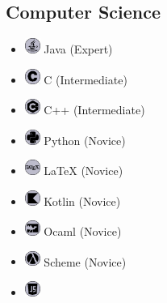 \documentclass[11pt, a4paper, sans]{moderncv}
\begin{document}
\subsection{Computer  Science}
\begin{multicols}{3}
	\begin{itemize}
	\item
		\includegraphics[align=c,width=5mm,height=5mm]{java.jpg}
		Java \footnotesize(Expert)\normalsize
	\item
		\includegraphics[align=c,width=5mm,height=5mm]{c.jpg}
		C \footnotesize(Intermediate)\normalsize
	\item
		\includegraphics[align=c,width=5mm,height=5mm]{cpp.jpg}
		 C++ \footnotesize(Intermediate)\normalsize
	\item
		\includegraphics[align=c,width=5mm,height=5mm]{python.jpg}
		 Python \footnotesize(Novice)\normalsize
	\item
		\includegraphics[align=c,width=5mm,height=5mm]{latex.jpg}
		 LaTeX \footnotesize(Novice)\normalsize
	\item
		\includegraphics[align=c,width=5mm,height=5mm]{kotlin.jpg}
		 Kotlin \footnotesize(Novice)\normalsize
	\item 
		\includegraphics[align=c,width=5mm,height=5mm]{ocaml.jpg}
		Ocaml \footnotesize(Novice)\normalsize
	\item 
		\includegraphics[align=c,width=5mm,height=5mm]{scheme.jpg}
		Scheme \footnotesize(Novice)\normalsize
	\item 
		\includegraphics[align=c,width=5mm,height=5mm]{js.png}

\end{itemize}
\end{multicols}
\end{document}
